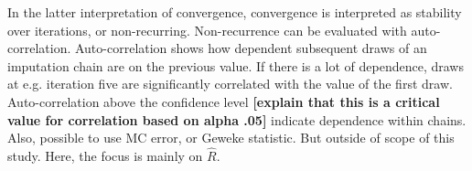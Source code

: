 \documentclass[article]{jss}
\begin{document}

In the latter interpretation of convergence, convergence is interpreted as stability over iterations, or non-recurring. Non-recurrence can be evaluated with auto-correlation. Auto-correlation shows how dependent subsequent draws of an imputation chain are on the previous value. If there is a lot of dependence, draws at e.g. iteration five are significantly correlated with the value of the first draw. Auto-correlation above the confidence level \textbf{[explain that this is a critical value for correlation based on alpha .05]} indicate dependence within chains. Also, possible to use MC error, or Geweke statistic. But outside of scope of this study. Here, the focus is mainly on $\widehat{R}$.
\end{document}
